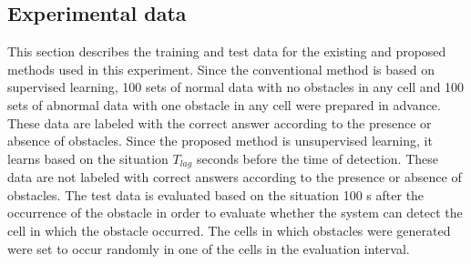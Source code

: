 \documentclass[paper]{ieice}
\begin{document}
\subsection{Experimental data}
\label{sec:experimental_data}
%
This section describes the training and test data for the existing and proposed methods used in this experiment.
%
Since the conventional method is based on supervised learning, 100 sets of normal data with no obstacles in any cell and 100 sets of abnormal data with one obstacle in any cell were prepared in advance.
%
These data are labeled with the correct answer according to the presence or absence of obstacles.
%
Since the proposed method is unsupervised learning, it learns based on the situation $T_{lag}$ seconds before the time of detection.
%
These data are not labeled with correct answers according to the presence or absence of obstacles.
%
The test data is evaluated based on the situation 100 s after the occurrence of the obstacle in order to evaluate whether the system can detect the cell in which the obstacle occurred.
%
The cells in which obstacles were generated were set to occur randomly in one of the cells in the evaluation interval.
%
\par
%
\end{document}
